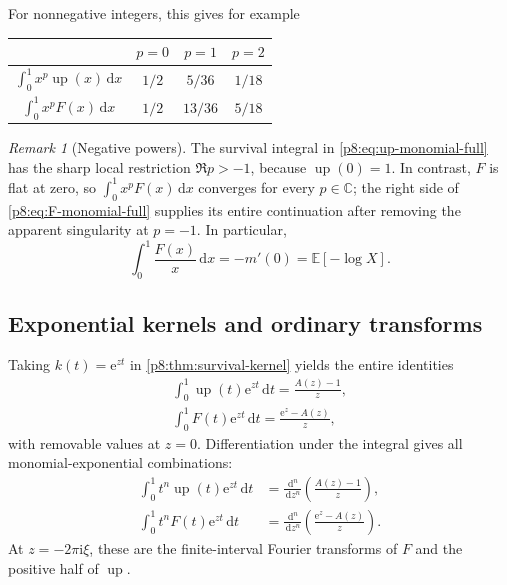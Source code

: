 \documentclass[11pt,oneside]{article}
\theoremstyle{definition}
\theoremstyle{remark}
\newtheorem{remark}[theorem]{Remark}
\newcommand{\Up}{\operatorname{up}}
\newcommand{\E}{\mathbb E}
\newcommand{\C}{\mathbb C}
\newcommand{\dd}{\,\mathrm d}
\newcommand{\e}{\mathrm e}
\newcommand{\ii}{\mathrm i}
\newcommand{\1}{\mathbf 1}
\begin{document}
For nonnegative integers, this gives for example
\begin{center}
\begin{tabular}{c|ccc}
\toprule
& \(p=0\) & \(p=1\) & \(p=2\)\\
\midrule
\(\int_0^1x^p\Up(x)\dd x\)
& \(1/2\) & \(5/36\) & \(1/18\)\\
\(\int_0^1x^pF(x)\dd x\)
& \(1/2\) & \(13/36\) & \(5/18\)\\
\bottomrule
\end{tabular}
\end{center}

\begin{remark}[Negative powers]
The survival integral in \eqref{p8:eq:up-monomial-full} has the sharp local
restriction \(\Re p>-1\), because \(\Up(0)=1\).  In contrast, \(F\) is flat at
zero, so \(\int_0^1x^pF(x)\dd x\) converges for every \(p\in\C\); the right side
of \eqref{p8:eq:F-monomial-full} supplies its entire continuation after removing
the apparent singularity at \(p=-1\).  In particular,
\begin{equation}
 \int_0^1\frac{F(x)}x\dd x=-m'(0)=\E[-\log X].
 \label{p8:eq:F-over-x}
\end{equation}
\end{remark}

\subsection{Exponential kernels and ordinary transforms}

Taking \(k(t)=\e^{zt}\) in \cref{p8:thm:survival-kernel} yields the entire
identities
\begin{align}
 \boxed{\int_0^1\Up(t)\e^{zt}\dd t=\frac{A(z)-1}{z},}
 \label{p8:eq:up-exp-transform}\\
 \boxed{\int_0^1F(t)\e^{zt}\dd t=\frac{\e^z-A(z)}{z},}
 \label{p8:eq:F-exp-transform}
\end{align}
with removable values at \(z=0\).  Differentiation under the integral gives all
monomial-exponential combinations:
\begin{align}
 \int_0^1t^n\Up(t)\e^{zt}\dd t
 &=\frac{\dd^n}{\dd z^n}\left(\frac{A(z)-1}{z}\right),
 \label{p8:eq:up-monomial-exp}\\
 \int_0^1t^nF(t)\e^{zt}\dd t
 &=\frac{\dd^n}{\dd z^n}\left(\frac{\e^z-A(z)}{z}\right).
 \label{p8:eq:F-monomial-exp}
\end{align}
At \(z=-2\pi\ii\xi\), these are the finite-interval Fourier transforms of
\(F\) and the positive half of \(\Up\).
\end{document}
